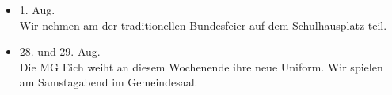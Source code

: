 \begin{history}
\begin{itemize}
        \item[]1. Aug.\\
        Wir nehmen am der traditionellen Bundesfeier auf dem Schulhausplatz
        teil.

        \item[]28. und 29. Aug.\\
        Die MG Eich weiht an diesem Wochenende ihre neue Uniform. Wir spielen am
        Samstagabend im Gemeindesaal.



    \end{itemize}

\end{history}
